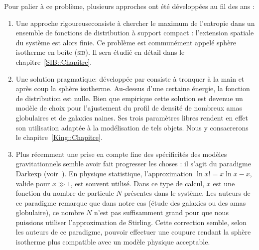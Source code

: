 Pour palier à ce problème, plusieurs approches ont été développées au fil des ans :

\begin{enumerate}
	\item Une approche \og{}rigoureuse\fg consiste à chercher le maximum de l'entropie dans un ensemble de fonctions de distribution à support compact :
		l'extension spatiale du système est alors finie. Ce problème est communément appelé sphère
		isotherme en boîte (\textsc{sib}). Il sera étudié en détail dans le chapitre~\ref{SIB::Chapitre}.
		
	\item Une solution \og{}pragmatique\fg: développée par \cite{King-1966AJ} consiste à tronquer à la main
		et après coup la sphère isotherme. Au-dessus d'une certaine énergie, la fonction de
		distribution est nulle. Bien que empirique cette solution est devenue un modèle de choix pour
		l'ajustement du profil de densité de nombreux amas globulaires et de galaxies naines. Ses trois
		paramètres libres rendent en effet son utilisation adaptée à la modélisation de tels objets.
		Nous y consacrerons le chapitre~\ref{King::Chapitre}.
	
	\item Plus récemment une prise en compte fine des spécificités des modèles gravitationnels semble avoir fait progresser les choses :
		il s'agit du paradigme Darkexp (voir~\citet{2010ApJ...722..851H}). En physique statistique, l'approximation $\ln x! = x\ln x
		-x$, valide pour $x\gg1$, est souvent utilisé. Dans ce type de calcul, $x$ est une fonction du nombre de particule $N$
		présentes dans le système. Les auteurs de ce paradigme remarque que dans notre cas (étude des galaxies ou des amas
		globulaire), ce nombre $N$ n'est pas suffisamment grand pour que nous puissions utiliser l'approximation de Stirling. Cette
		correction semble, selon les auteurs de ce paradigme, pouvoir effectuer une coupure rendant la sphère isotherme plus
		compatible avec un modèle physique acceptable.

\end{enumerate}
